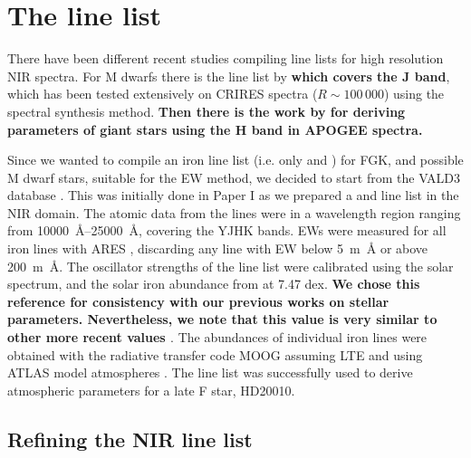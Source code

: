 \documentclass{aa}
\begin{document}
\section{The line list}

There have been different recent studies compiling line lists for high resolution NIR spectra. For M
dwarfs there is the line list by \citet{Onehag2012,Lindgren2016} {\bf which covers the J band},
which has been tested extensively on CRIRES spectra ($R\sim100\,000$) using the spectral synthesis
method. {\bf Then there is the work by \citet{Shetrone2015} for deriving parameters of giant stars
using the H band in APOGEE spectra.}

Since we wanted to compile an iron line list (i.e. only  and ) for FGK, and
possible M dwarf stars, suitable for the EW method, we decided to start from the VALD3 database
\citep{VALD1,VALD2}. This was initially done in Paper I as we prepared a  and
 line list in the NIR domain. The atomic data from the lines were in a wavelength region
ranging from \SIrange{10000}{25000}{\AA}, covering the YJHK bands. EWs were measured for all iron
lines with ARES \citep{Sousa2015a}, discarding any line with EW below \SI{5}{m\AA} or above
\SI{200}{m\AA}. The oscillator strengths of the line list were calibrated using the solar spectrum,
and the solar iron abundance from \citet{Gonzalez2000} at 7.47 dex. {\bf We chose this reference for
consistency with our previous works on stellar parameters. Nevertheless, we note that this value is
very similar to other more recent values \citep[e.g.][]{Asplund2009}}. The
abundances of individual iron lines were obtained with the radiative transfer code MOOG
\citep{Sneden1973} assuming LTE and using ATLAS model atmospheres \citep{Kurucz1993}. The line list
was successfully used to derive atmospheric parameters for a late F star, HD20010.


\subsection{Refining the NIR line list}
\label{sec:refining_the_line_list}
\end{document}
